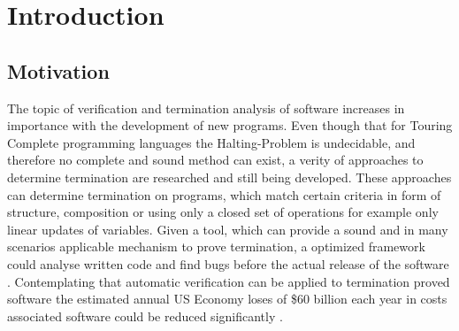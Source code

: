 \chapter{Introduction}

\section{Motivation}
The topic of verification and termination analysis of software increases in importance with the development of new programs. Even though that for Touring Complete programming languages the Halting-Problem is undecidable, and therefore no complete and sound method can exist, a verity of approaches to determine termination are researched and still being developed. These approaches can determine termination on programs, which match certain criteria in form of structure, composition or using only a closed set of operations for example only linear updates of variables. \newline
Given a tool, which can provide a sound and in many scenarios applicable mechanism to prove termination, a optimized framework could analyse written code and find bugs before the actual release of the software \cite{verschaetse1993automatic}. Contemplating that automatic verification can be applied to termination proved software the estimated annual US Economy loses of \$60 billion each year in costs associated software could be reduced significantly \cite{zhivich2009real}. \newline

